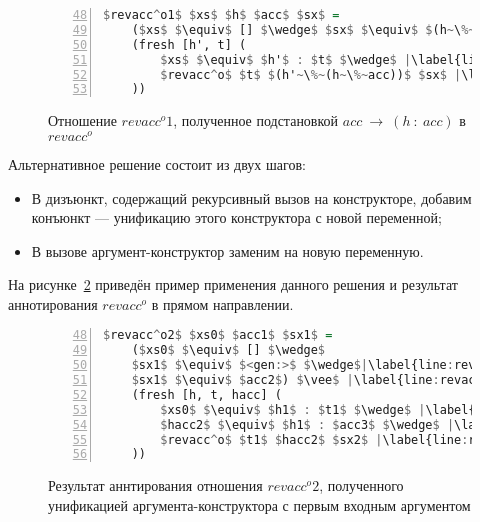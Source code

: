 \begin{figure}[h!]
  \begin{center}
  \begin{minipage}{0.4\textwidth}
  \begin{lstlisting}[language=Haskell, frame=single, numbers=left,numberstyle=\small, firstnumber=48, escapechar=|]
  $revacc^o1$ $xs$ $h$ $acc$ $sx$ =
    ($xs$ $\equiv$ [] $\wedge$ $sx$ $\equiv$ $(h~\%~acc)$) $\vee$ |\label{line:revacco12}|
    (fresh [h', t] (
        $xs$ $\equiv$ $h'$ : $t$ $\wedge$ |\label{line:revacco14}|
        $revacc^o$ $t$ $(h'~\%~(h~\%~acc))$ $sx$ |\label{line:revacco15}|
    ))
    \end{lstlisting}
  \end{minipage}
  \end{center}
  \caption{Отношение $revacc^o1$, полученное подстановкой $acc~\rightarrow~(h~:~acc)$ в $revacc^o$}
  \label{lst:revacco1}
\end{figure}

Альтернативное решение состоит из двух шагов:
\begin{itemize}
    \item В дизъюнкт, содержащий рекурсивный вызов на конструкторе, добавим конъюнкт --- унификацию этого конструктора с новой переменной;
    \item В вызове аргумент-конструктор заменим на новую переменную.
\end{itemize}

На рисунке~\ref{lst:revacco2IOOANN} приведён пример применения данного решения и результат аннотирования $revacc^o$ в прямом направлении.

\begin{figure}[h!]
  \begin{center}
  \begin{minipage}{0.4\textwidth}
  \begin{lstlisting}[language=Haskell, frame=single, numbers=left,numberstyle=\small, firstnumber=48, escapechar=|]
  $revacc^o2$ $xs0$ $acc1$ $sx1$ =
    ($xs0$ $\equiv$ [] $\wedge$
    $sx1$ $\equiv$ $<gen:>$ $\wedge$|\label{line:revacco2IOOANN2}|
    $sx1$ $\equiv$ $acc2$) $\vee$ |\label{line:revacco2IOOANN3}|
    (fresh [h, t, hacc] (
        $xs0$ $\equiv$ $h1$ : $t1$ $\wedge$ |\label{line:revacco2IOOANN5}|
        $hacc2$ $\equiv$ $h1$ : $acc3$ $\wedge$ |\label{line:revacco2IOOANN6}|
        $revacc^o$ $t1$ $hacc2$ $sx2$ |\label{line:revacco2IOOANN7}|
    ))
    \end{lstlisting}
  \end{minipage}
  \end{center}
  \caption{Результат аннтирования отношения $revacc^o2$, полученного унификацией аргумента-конструктора с первым входным аргументом}
  \label{lst:revacco2IOOANN}
\end{figure}

